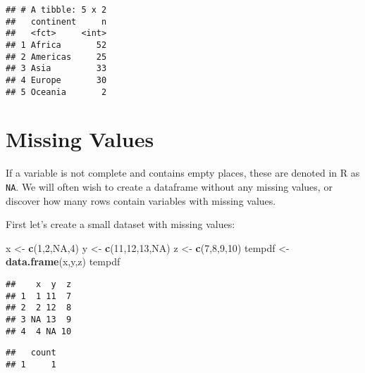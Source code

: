 \documentclass[
]{book}
\newenvironment{Shaded}{\begin{snugshade}}{\end{snugshade}}
\newcommand{\CommentTok}[1]{\textcolor[rgb]{0.56,0.35,0.01}{\textit{#1}}}
\newcommand{\DataTypeTok}[1]{\textcolor[rgb]{0.13,0.29,0.53}{#1}}
\newcommand{\DecValTok}[1]{\textcolor[rgb]{0.00,0.00,0.81}{#1}}
\newcommand{\KeywordTok}[1]{\textcolor[rgb]{0.13,0.29,0.53}{\textbf{#1}}}
\newcommand{\NormalTok}[1]{#1}
\newcommand{\OperatorTok}[1]{\textcolor[rgb]{0.81,0.36,0.00}{\textbf{#1}}}
\newcommand{\OtherTok}[1]{\textcolor[rgb]{0.56,0.35,0.01}{#1}}
\newcommand{\StringTok}[1]{\textcolor[rgb]{0.31,0.60,0.02}{#1}}
\begin{document}
\begin{verbatim}
## # A tibble: 5 x 2
##   continent     n
##   <fct>     <int>
## 1 Africa       52
## 2 Americas     25
## 3 Asia         33
## 4 Europe       30
## 5 Oceania       2
\end{verbatim}

\hypertarget{missing-values}{%
\section{Missing Values}\label{missing-values}}

If a variable is not complete and contains empty places, these are denoted in R as \texttt{NA}. We will often wish to create a dataframe without any missing values, or discover how many rows contain variables with missing values.

First let's create a small dataset with missing values:

\begin{Shaded}
\begin{Highlighting}[]
\NormalTok{x <-}\StringTok{ }\KeywordTok{c}\NormalTok{(}\DecValTok{1}\NormalTok{,}\DecValTok{2}\NormalTok{,}\OtherTok{NA}\NormalTok{,}\DecValTok{4}\NormalTok{)}
\NormalTok{y <-}\StringTok{ }\KeywordTok{c}\NormalTok{(}\DecValTok{11}\NormalTok{,}\DecValTok{12}\NormalTok{,}\DecValTok{13}\NormalTok{,}\OtherTok{NA}\NormalTok{)}
\NormalTok{z <-}\StringTok{ }\KeywordTok{c}\NormalTok{(}\DecValTok{7}\NormalTok{,}\DecValTok{8}\NormalTok{,}\DecValTok{9}\NormalTok{,}\DecValTok{10}\NormalTok{)}
\NormalTok{tempdf <-}\StringTok{ }\KeywordTok{data.frame}\NormalTok{(x,y,z)}
\NormalTok{tempdf}
\end{Highlighting}
\end{Shaded}

\begin{verbatim}
##    x  y  z
## 1  1 11  7
## 2  2 12  8
## 3 NA 13  9
## 4  4 NA 10
\end{verbatim}

\begin{Shaded}
\end{Shaded}

\begin{verbatim}
##   count
## 1     1
\end{verbatim}
\end{document}
